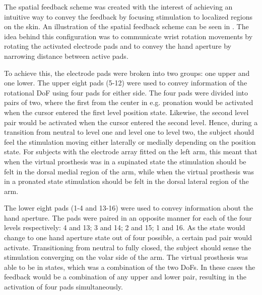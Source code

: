 The spatial feedback scheme was created with the interest of achieving an intuitive way to convey the feedback by focusing stimulation to localized regions on the skin. An illustration of the spatial feedback scheme can be seen in . The idea behind this configuration was to communicate wrist rotation movements by rotating the activated electrode pads and to convey the hand aperture by narrowing distance between active pads. 

To achieve this, the electrode pads were broken into two groups: one upper and one lower. The upper eight pads (5-12) were used to convey information of the rotational DoF using four pads for either side.  The four pads were divided into pairs of two, where the first from the center in e.g. pronation would be activated when the cursor entered the first level position state. Likewise, the second level pair would be activated when the cursor entered the second level. Hence, during a transition from neutral to level one and level one to level two, the subject should feel the stimulation moving either laterally or medially depending on the position state. For subjects with the electrode array fitted on the left arm, this meant that when the virtual prosthesis was in a supinated state the stimulation should be felt in the dorsal medial region of the arm, while when the virtual prosthesis was in a pronated state stimulation should be felt in the dorsal lateral region of the arm.   

The lower eight pads (1-4 and 13-16) were used to convey information about the hand aperture. The pads were paired in an opposite manner for each of the four levels respectively: 4 and 13; 3 and 14; 2 and 15; 1 and 16. As the state would change to one hand aperture state out of four possible, a certain pad pair would activate. Transitioning from neutral to fully closed, the subject should sense the stimulation converging on the volar side of the arm. The virtual prosthesis was able to be in states, which was a combination of the two DoFs. In these cases the feedback would be a combination of any upper and lower pair, resulting in the activation of four pads simultaneously. %

